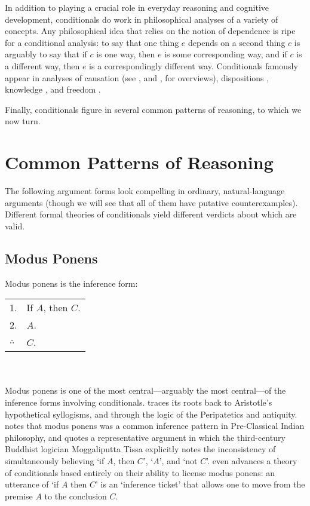 In addition to playing a crucial role in everyday reasoning and cognitive development, conditionals do work in philosophical analyses of a variety of concepts.  Any philosophical idea that relies on the notion of dependence is ripe for a conditional analysis: to say that one thing $e$ depends on a second thing $c$ is arguably to say that if $c$ is one way, then $e$ is some corresponding way, and if $c$ is a different way, then $e$ is a correspondingly different way.  Conditionals famously appear in analyses of causation (see \citealp{menzies-sep}, and \citealp{Collins2004-COLCAC-2}, for overviews), dispositions \citep{prior-pargetter-jackson, choi-simple-reformed, choi-conditional-dispositions}, knowledge \citep{nozick-knowledge, sosa-moore}, and freedom \citep{moore-ethics, ayer-freedom}.

Finally, conditionals figure in several common patterns of reasoning, to which we now turn.

\section{Common Patterns of Reasoning}
\label{reasoning-patterns}

The following argument forms look compelling in ordinary, natural-language arguments (though we will see that all of them have putative counterexamples).  Different formal theories of conditionals yield different verdicts about which are valid.

\subsection{Modus Ponens}

Modus ponens is the inference form:\smallskip\\
\begin{tabular}{ll}
1. & If $A$, then $C$.\\
2. &$A$.\\
\hline
$\therefore$ & $C$.
\end{tabular}\\\smallskip\\
Modus ponens is one of the most central---arguably the most central---of the inference forms involving conditionals. \citet{Bobzien2002-BOBTDO-2} traces its roots back to Aristotle's hypothetical syllogisms, and through the logic of the Peripatetics and antiquity. \citet{sep-logic-india} notes that modus ponens was a common inference pattern in Pre-Classical Indian philosophy, and quotes a representative argument in which the third-century Buddhist logician Moggaliputta Tissa explicitly notes the inconsistency of simultaneously believing `if $A$, then $C$', `$A$', and `not $C$'.    \citet{ryle-ifsobecause} even advances a theory of conditionals based entirely on their ability to license modus ponens: an utterance of `if $A$ then $C$' is an `inference ticket' that allows one to move from the premise $A$ to the conclusion $C$.

